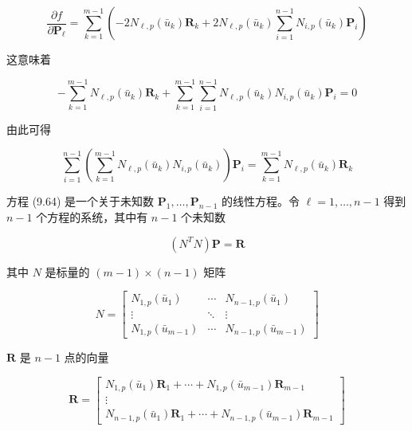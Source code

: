 \documentclass[../main.tex]{subfiles}
\begin{document}
\[
\frac{\partial f}{\partial {\mathbf{P}}_{\ell }} = \mathop{\sum }\limits_{{k = 1}}^{{m - 1}}\left( {-2{N}_{\ell ,p}\left( {\bar{u}}_{k}\right) {\mathbf{R}}_{k} + 2{N}_{\ell ,p}\left( {\bar{u}}_{k}\right) \mathop{\sum }\limits_{{i = 1}}^{{n - 1}}{N}_{i,p}\left( {\bar{u}}_{k}\right) {\mathbf{P}}_{i}}\right)
\]

这意味着

\[
- \mathop{\sum }\limits_{{k = 1}}^{{m - 1}}{N}_{\ell ,p}\left( {\bar{u}}_{k}\right) {\mathbf{R}}_{k} + \mathop{\sum }\limits_{{k = 1}}^{{m - 1}}\mathop{\sum }\limits_{{i = 1}}^{{n - 1}}{N}_{\ell ,p}\left( {\bar{u}}_{k}\right) {N}_{i,p}\left( {\bar{u}}_{k}\right) {\mathbf{P}}_{i} = 0
\]

由此可得

\[
\mathop{\sum }\limits_{{i = 1}}^{{n - 1}}\left( {\mathop{\sum }\limits_{{k = 1}}^{{m - 1}}{N}_{\ell ,p}\left( {\bar{u}}_{k}\right) {N}_{i,p}\left( {\bar{u}}_{k}\right) }\right) {\mathbf{P}}_{i} = \mathop{\sum }\limits_{{k = 1}}^{{m - 1}}{N}_{\ell ,p}\left( {\bar{u}}_{k}\right) {\mathbf{R}}_{k} \tag{9.64}
\]

方程 (9.64) 是一个关于未知数 \({\mathbf{P}}_{1},\ldots ,{\mathbf{P}}_{n - 1}\) 的线性方程。令 \(\ell  = 1,\ldots ,n - 1\) 得到 \(n - 1\) 个方程的系统，其中有 \(n - 1\) 个未知数

\[
\left( {{N}^{T}N}\right) \mathbf{P} = \mathbf{R} \tag{9.65}
\]

其中 \(N\) 是标量的 \(\left( {m - 1}\right)  \times  \left( {n - 1}\right)\) 矩阵

\[
N = \left\lbrack  \begin{matrix} {N}_{1,p}\left( {\bar{u}}_{1}\right) & \cdots & {N}_{n - 1,p}\left( {\bar{u}}_{1}\right) \\  \vdots &  \ddots  & \vdots \\  {N}_{1,p}\left( {\bar{u}}_{m - 1}\right) & \cdots & {N}_{n - 1,p}\left( {\bar{u}}_{m - 1}\right)  \end{matrix}\right\rbrack   \tag{9.66}
\]

\(\mathbf{R}\) 是 \(n - 1\) 点的向量

\[
\mathbf{R} = \left\lbrack  \begin{matrix} {N}_{1,p}\left( {\bar{u}}_{1}\right) {\mathbf{R}}_{1} + \cdots  + {N}_{1,p}\left( {\bar{u}}_{m - 1}\right) {\mathbf{R}}_{m - 1} \\  \vdots \\  {N}_{n - 1,p}\left( {\bar{u}}_{1}\right) {\mathbf{R}}_{1} + \cdots  + {N}_{n - 1,p}\left( {\bar{u}}_{m - 1}\right) {\mathbf{R}}_{m - 1} \end{matrix}\right\rbrack   \tag{9.67}
\]
\end{document}
